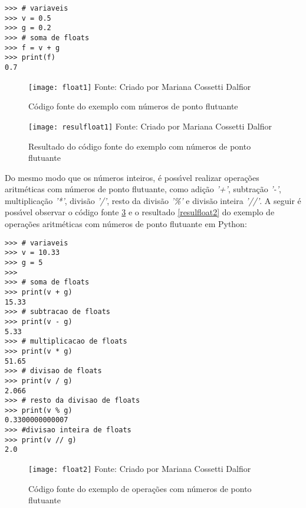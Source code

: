 \begin{lstlisting}
>>> # variaveis
>>> v = 0.5
>>> g = 0.2
>>> # soma de floats
>>> f = v + g
>>> print(f)
0.7
\end{lstlisting}

\begin{figure}[H]
	\begin{center}
		\caption{C\'{o}digo fonte do exemplo com n\'{u}meros de ponto flutuante} \label{fontefloat1}
		\texttt{[image: float1]} 
		\newline
		Fonte: Criado por Mariana Cossetti Dalfior
	\end{center}
\end{figure}

\begin{figure}[H]
	\begin{center}
		\caption{Resultado do c\'{o}digo fonte do exemplo com n\'{u}meros de ponto flutuante} \label{resulfloat1}
		\texttt{[image: resulfloat1]} 
		\newline
		Fonte: Criado por Mariana Cossetti Dalfior
	\end{center}
\end{figure}

Do mesmo modo que os n\'{u}meros inteiros, \'{e} poss\'{\i}vel realizar opera\c{c}\~{o}es aritm\'{e}ticas com n\'{u}meros de ponto flutuante, como adi\c{c}\~{a}o \textsl{'+'}, subtra\c{c}\~{a}o \textsl{'-'}, multiplica\c{c}\~{a}o \textsl{'*'}, divis\~{a}o \textsl{'/'}, resto da divis\~{a}o \textsl{'\%'} e divis\~{a}o inteira \textsl{'//'}. A seguir \'{e} poss\'{\i}vel observar o c\'{o}digo fonte \ref{fontefloat2} e o resultado \ref{resulfloat2} do exemplo de opera\c{c}\~{o}es aritm\'{e}ticas com n\'{u}meros de ponto flutuante em Python:

\begin{lstlisting}
>>> # variaveis 
>>> v = 10.33
>>> g = 5
>>>
>>> # soma de floats
>>> print(v + g)
15.33
>>> # subtracao de floats
>>> print(v - g) 
5.33
>>> # multiplicacao de floats
>>> print(v * g)
51.65
>>> # divisao de floats
>>> print(v / g)
2.066
>>> # resto da divisao de floats
>>> print(v % g)
0.3300000000007
>>> #divisao inteira de floats
>>> print(v // g) 
2.0
\end{lstlisting}

\begin{figure}[H]
	\begin{center}
		\caption{C\'{o}digo fonte do exemplo de opera\c{c}\~{o}es com n\'{u}meros de ponto flutuante} \label{fontefloat2}
		\texttt{[image: float2]} 
		\newline
		Fonte: Criado por Mariana Cossetti Dalfior
	\end{center}
\end{figure}

